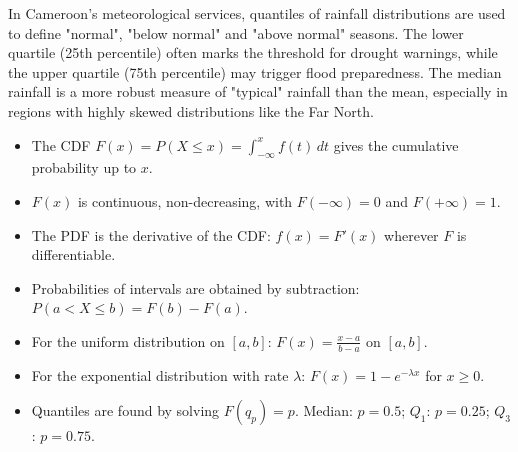 \documentclass[11pt]{article}
\begin{document}
\begin{savaistu}
In Cameroon's meteorological services, quantiles of rainfall distributions are used to define "normal", "below normal" and "above normal" seasons. The lower quartile (25th percentile) often marks the threshold for drought warnings, while the upper quartile (75th percentile) may trigger flood preparedness. The median rainfall is a more robust measure of "typical" rainfall than the mean, especially in regions with highly skewed distributions like the Far North.
\end{savaistu}

\begin{aretenir}
\begin{itemize}
\item The CDF \(F(x) = P(X \le x) = \int_{-\infty}^{x} f(t)\, dt\) gives the cumulative probability up to \(x\).
\item \(F(x)\) is continuous, non-decreasing, with \(F(-\infty)=0\) and \(F(+\infty)=1\).
\item The PDF is the derivative of the CDF: \(f(x) = F'(x)\) wherever \(F\) is differentiable.
\item Probabilities of intervals are obtained by subtraction: \(P(a < X \le b) = F(b) - F(a)\).
\item For the uniform distribution on \([a,b]\): \(F(x) = \frac{x-a}{b-a}\) on \([a,b]\).
\item For the exponential distribution with rate \(\lambda\): \(F(x) = 1 - e^{-\lambda x}\) for \(x \ge 0\).
\item Quantiles are found by solving \(F(q_p) = p\). Median: \(p=0.5\); \(Q_1\): \(p=0.25\); \(Q_3\): \(p=0.75\).
\end{itemize}
\end{aretenir}
\end{document}
